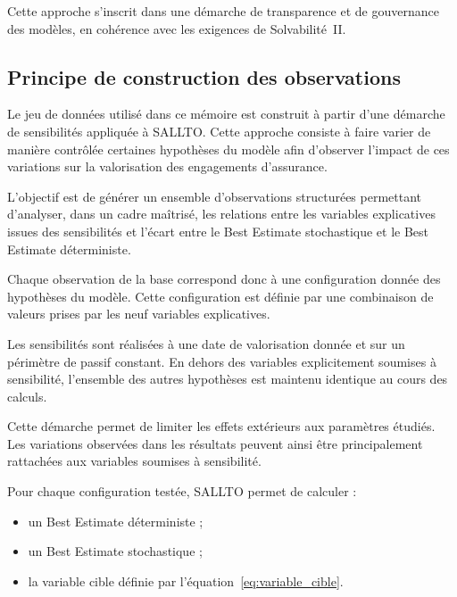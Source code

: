 Cette approche s'inscrit dans une démarche de transparence et de gouvernance des modèles, en cohérence avec les exigences de Solvabilité~II.


\subsection{Principe de construction des observations}

Le jeu de données utilisé dans ce mémoire est construit à partir d'une démarche de sensibilités appliquée à SALLTO. Cette approche consiste à faire varier de manière contrôlée certaines hypothèses du modèle afin d'observer l'impact de ces variations sur la valorisation des engagements d'assurance.

L'objectif est de générer un ensemble d'observations structurées permettant d'analyser, dans un cadre maîtrisé, les relations entre les variables explicatives issues des sensibilités et l'écart entre le Best Estimate stochastique et le Best Estimate déterministe.

Chaque observation de la base correspond donc à une configuration donnée des hypothèses du modèle. Cette configuration est définie par une combinaison de valeurs prises par les neuf variables explicatives.

Les sensibilités sont réalisées à une date de valorisation donnée et sur un périmètre de passif constant. En dehors des variables explicitement soumises à sensibilité, l'ensemble des autres hypothèses est maintenu identique au cours des calculs.

Cette démarche permet de limiter les effets extérieurs aux paramètres étudiés. Les variations observées dans les résultats peuvent ainsi être principalement rattachées aux variables soumises à sensibilité.

Pour chaque configuration testée, SALLTO permet de calculer :

\begin{itemize}
    \item un Best Estimate déterministe ;
    \item un Best Estimate stochastique ;
    \item la variable cible définie par l'équation~\eqref{eq:variable_cible}.
\end{itemize}



